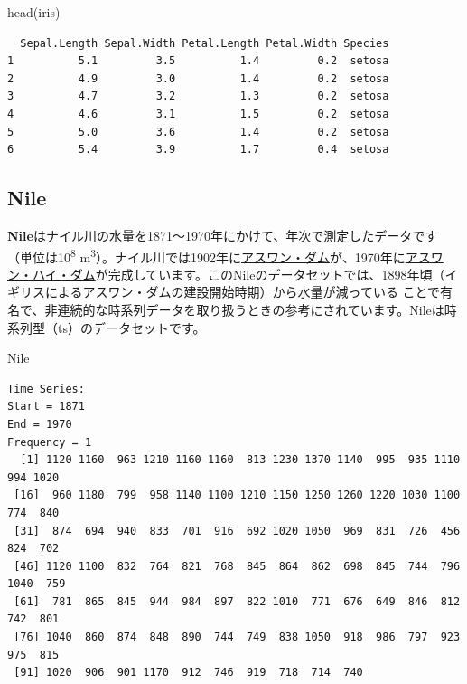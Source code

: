 \documentclass[
  letterpaper,
  DIV=11,
  numbers=noendperiod]{scrreprt}
\newenvironment{Shaded}{\begin{snugshade}}{\end{snugshade}}
\newcommand{\FunctionTok}[1]{\textcolor[rgb]{0.28,0.35,0.67}{#1}}
\newcommand{\NormalTok}[1]{\textcolor[rgb]{0.00,0.23,0.31}{#1}}
\begin{document}
\begin{Shaded}
\begin{Highlighting}[]
\FunctionTok{head}\NormalTok{(iris)}
\end{Highlighting}
\end{Shaded}

\begin{verbatim}
  Sepal.Length Sepal.Width Petal.Length Petal.Width Species
1          5.1         3.5          1.4         0.2  setosa
2          4.9         3.0          1.4         0.2  setosa
3          4.7         3.2          1.3         0.2  setosa
4          4.6         3.1          1.5         0.2  setosa
5          5.0         3.6          1.4         0.2  setosa
6          5.4         3.9          1.7         0.4  setosa
\end{verbatim}

\hypertarget{nile}{%
\subsection{Nile}\label{nile}}

\textbf{Nile}はナイル川の水量を1871～1970年にかけて、年次で測定したデータです（単位は10\textsuperscript{8}
m\textsuperscript{3}）。ナイル川では1902年に\href{https://ja.wikipedia.org/wiki/\%E3\%82\%A2\%E3\%82\%B9\%E3\%83\%AF\%E3\%83\%B3\%E3\%83\%BB\%E3\%83\%AD\%E3\%82\%A6\%E3\%83\%BB\%E3\%83\%80\%E3\%83\%A0}{アスワン・ダム}が、1970年に\href{https://ja.wikipedia.org/wiki/\%E3\%82\%A2\%E3\%82\%B9\%E3\%83\%AF\%E3\%83\%B3\%E3\%83\%BB\%E3\%83\%8F\%E3\%82\%A4\%E3\%83\%BB\%E3\%83\%80\%E3\%83\%A0}{アスワン・ハイ・ダム}が完成しています。このNileのデータセットでは、1898年頃（イギリスによるアスワン・ダムの建設開始時期）から水量が減っている
ことで有名で、非連続的な時系列データを取り扱うときの参考にされています。Nileは時系列型（ts）のデータセットです。

\begin{Shaded}
\begin{Highlighting}[]
\NormalTok{Nile}
\end{Highlighting}
\end{Shaded}

\begin{verbatim}
Time Series:
Start = 1871 
End = 1970 
Frequency = 1 
  [1] 1120 1160  963 1210 1160 1160  813 1230 1370 1140  995  935 1110  994 1020
 [16]  960 1180  799  958 1140 1100 1210 1150 1250 1260 1220 1030 1100  774  840
 [31]  874  694  940  833  701  916  692 1020 1050  969  831  726  456  824  702
 [46] 1120 1100  832  764  821  768  845  864  862  698  845  744  796 1040  759
 [61]  781  865  845  944  984  897  822 1010  771  676  649  846  812  742  801
 [76] 1040  860  874  848  890  744  749  838 1050  918  986  797  923  975  815
 [91] 1020  906  901 1170  912  746  919  718  714  740
\end{verbatim}
\end{document}
